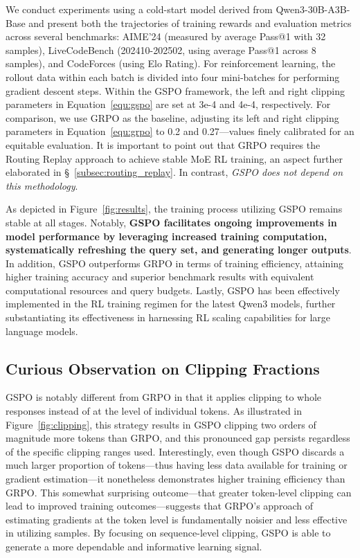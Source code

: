 We conduct experiments using a cold-start model derived from Qwen3-30B-A3B-Base and present both the trajectories of training rewards and evaluation metrics across several benchmarks: AIME'24 (measured by average Pass@1 with 32 samples), LiveCodeBench (202410-202502, using average Pass@1 across 8 samples), and CodeForces (using Elo Rating). For reinforcement learning, the rollout data within each batch is divided into four mini-batches for performing gradient descent steps. Within the GSPO framework, the left and right clipping parameters in Equation~\eqref{equ:gspo} are set at 3e-4 and 4e-4, respectively. For comparison, we use GRPO as the baseline, adjusting its left and right clipping parameters in Equation~\eqref{equ:grpo} to 0.2 and 0.27—values finely calibrated for an equitable evaluation. It is important to point out that GRPO requires the Routing Replay approach to achieve stable MoE RL training, an aspect further elaborated in \S~\ref{subsec:routing_replay}. In contrast, \textit{GSPO does not depend on this methodology}.

As depicted in Figure~\ref{fig:results}, the training process utilizing GSPO remains stable at all stages. Notably, \textbf{GSPO facilitates ongoing improvements in model performance by leveraging increased training computation, systematically refreshing the query set, and generating longer outputs}. In addition, GSPO outperforms GRPO in terms of training efficiency, attaining higher training accuracy and superior benchmark results with equivalent computational resources and query budgets. Lastly, GSPO has been effectively implemented in the RL training regimen for the latest Qwen3 models, further substantiating its effectiveness in harnessing RL scaling capabilities for large language models.

\subsection{Curious Observation on Clipping Fractions}

GSPO is notably different from GRPO in that it applies clipping to whole responses instead of at the level of individual tokens. As illustrated in Figure~\ref{fig:clipping}, this strategy results in GSPO clipping two orders of magnitude more tokens than GRPO, and this pronounced gap persists regardless of the specific clipping ranges used. Interestingly, even though GSPO discards a much larger proportion of tokens—thus having less data available for training or gradient estimation—it nonetheless demonstrates higher training efficiency than GRPO. This somewhat surprising outcome—that greater token-level clipping can lead to improved training outcomes—suggests that GRPO's approach of estimating gradients at the token level is fundamentally noisier and less effective in utilizing samples. By focusing on sequence-level clipping, GSPO is able to generate a more dependable and informative learning signal.

